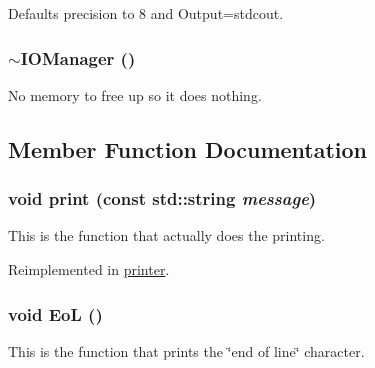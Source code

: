 Defaults precision to 8 and Output=stdcout. \hypertarget{classJKBuilder_1_1IOManager_ad7f67249558880cb6386ff44abea33f2}{
\subsubsection[{$\sim$IOManager}]{\setlength{\rightskip}{0pt plus 5cm}$\sim${\bf IOManager} ()}}
\label{classJKBuilder_1_1IOManager_ad7f67249558880cb6386ff44abea33f2}


No memory to free up so it does nothing. 

\subsection{Member Function Documentation}
\hypertarget{classJKBuilder_1_1IOManager_a3abc9519dd5220ecb1154daa25f557fe}{
\subsubsection[{print}]{\setlength{\rightskip}{0pt plus 5cm}void print (const std::string {\em message})}}
\label{classJKBuilder_1_1IOManager_a3abc9519dd5220ecb1154daa25f557fe}


This is the function that actually does the printing. 

Reimplemented in \hyperlink{classJKBuilder_1_1printer_aa32ee0a81ade611982bfc9861c5a05bb}{printer}.\hypertarget{classJKBuilder_1_1IOManager_a7f207ac705d33a0cd9794a9f0b4a1fa0}{
\subsubsection[{EoL}]{\setlength{\rightskip}{0pt plus 5cm}void EoL ()}}
\label{classJKBuilder_1_1IOManager_a7f207ac705d33a0cd9794a9f0b4a1fa0}


This is the function that prints the \char`\"{}end of line\char`\"{} character. 

